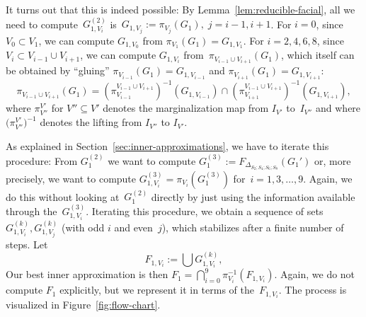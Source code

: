 \documentclass[aos,noinfoline]{imsart}
\newcommand{\face}{F}
\theoremstyle{remark}
\theoremstyle{definition}
\begin{document}
It turns out that this is indeed possible: By Lemma~\ref{lem:reducible-facial}, all we need to compute~$G^{(2)}_{1,V_{i}}$
is~$G_{1,V_{j}}:=\pi_{V_{j}}(G_{1}),\;j=i-1,i+1$.  For $i=0$, since $V_{0}\subset V_{1}$, we can compute $G_{1,V_{0}}$ from
$\pi_{V_{1}}(G_{1})=G_{1,V_{1}}$.  For $i=2,4,6,8$, since $V_{i}\subset V_{i-1}\cup V_{i+1}$, we can compute
$G_{1,V_{i}}$ from~$\pi_{V_{i-1}\cup V_{i+1}}(G_{1})$, which itself can be obtained by ``gluing''
$\pi_{V_{i-1}}(G_{1})=G_{1,V_{i-1}}$ and $\pi_{V_{i+1}}(G_{1})=G_{1,V_{i+1}}$:
\begin{equation*}
  \pi_{V_{i-1}\cup V_{i+1}}(G_{1}) = \left(\pi^{V_{i-1}\cup V_{i+1}}_{V_{i-1}}\right)^{-1}(G_{1,V_{i-1}}) \cap \left(\pi^{V_{i-1}\cup V_{i+1}}_{V_{i+1}}\right)^{-1}(G_{1,V_{i+1}}),
\end{equation*}
where $\pi^{V'}_{V''}$ for $V''\subseteq V'$ denotes the marginalization map from $I_{V'}$ to~$I_{V''}$ and where $\Big(\pi^{V'}_{V''}\Big)^{-1}$ denotes the lifting from $I_{V''}$ to $I_{V'}$.

As explained in Section~\ref{sec:inner-approximations}, we have to iterate this procedure: From $G^{(2)}_{1}$ we want to
compute $G^{(3)}_{1}:=\face_{\Delta_{S_{2};S_{4};S_{6};S_{8}}}(G_{1}')$ or, more precisely, we want to compute
$G^{(3)}_{1,V_{i}}=\pi_{V_{i}}(G^{(3)}_{1})$ for~$i=1,3,\dots,9$.  Again, we do this without looking at~$G^{(2)}_{1}$
directly by just using the information available through the~$G^{(3)}_{1,V_{i}}$.  Iterating this procedure, we obtain a
sequence of sets $G^{(k)}_{1,V_{i}}, G^{(k)}_{1,V_{j}}$ (with odd $i$ and even~$j$), which stabilizes after a finite
number of steps.  Let
\begin{equation*}
  F_{1,V_{i}} := 
    \bigcup G^{(k)}_{1,V_{i}},
\end{equation*}
Our best inner approximation is then $F_{1} = \bigcap_{i=0}^{9}\pi_{V_{i}}^{-1}(F_{1, V_i})$.  Again, we do not compute
$F_{1}$ explicitly, but we represent it in terms of the~$F_{1,V_{i}}$.
The process is visualized in Figure~\ref{fig:flow-chart}.
\end{document}

